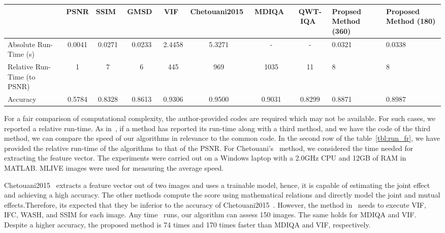 \begin{sidewaystable}[htb]
    \caption{The Algorithms' Run-Time }
    \label{tbl:run_fr}
  \bigskip
    \centering\footnotesize\setlength\tabcolsep{2pt}
        \hspace*{-1cm}\begin{tabular}{m{3cm}||c|c|c|c|c|c|c|m{1.2cm}|m{1cm}}
             &PSNR&SSIM~\cite{Wang2004}&GMSD~\cite{Xue2014}&VIF~\cite{Sheikh2006}&Chetouani2015~\cite{Chetouani2015}&MDIQA~\cite{zhang2019full}&QWT-IQA~\cite{Li2018a}&Propsed Method (360)&Proposed Method (180)\\
             \hline\hline
             Absolute \newline Run-Time (s)&0.0041&0.0271&0.0233&2.4458&5.3271&-&-&0.0321&0.0338\\[1ex]
             \hline
             Relative \newline Run-Time \newline (to PSNR)&1&7&6&445&969&1035&11&8&8\\[1ex]
             \hline
             Accuracy&0.5784&0.8328&0.8613&0.9306&0.9500&0.9031&0.8299&0.8871&0.8987\\[1ex]
             \hline\hline
        \end{tabular}\hspace*{-1cm}
\end{sidewaystable}

For a fair comparison of computational complexity, the author-provided codes are required which may not be available. For such cases, we reported a relative run-time. As in~\cite{wang2019blind}, if a method has reported its run-time along with a third method, and we have the code of the third method, we can compare the speed of our algorithms in relevance to the common code. In the second row of the table~\ref{tbl:run_fr}, we have provided the relative run-time of the algorithms to that of the PSNR. For Chetouani's~\cite{Chetouani2015} method, we considered the time needed for extracting the feature vector. The experiments were carried out on a Windows laptop with a 2.0GHz CPU and 12GB of RAM in MATLAB. MLIVE images were used for measuring the average speed. 

Chetouani2015~\cite{Chetouani2015} extracts a feature vector out of two images and uses a trainable model, hence, it is capable of estimating the joint effect and achieving a high accuracy. The other methods compute the score using mathematical relations and directly model the joint and mutual effects.Therefore, its expected that they be inferior to the accuracy of Chetouani2015~\cite{Chetouani2015}. However, the method in~\cite{Chetouani2015} needs to execute VIF, IFC, WASH, and SSIM for each image. Any time~\cite{Chetouani2015} runs, our algorithm can assess 150 images. The same holds for MDIQA and VIF. Despite a higher accuracy, the proposed method is 74 times and 170 times faster than MDIQA and VIF, respectively. 

